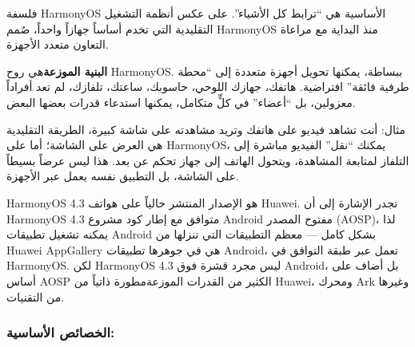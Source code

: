 


فلسفة HarmonyOS الأساسية هي “ترابط كل الأشياء”. على عكس أنظمة التشغيل التقليدية التي تخدم أساساً جهازاً واحداً، صُمم HarmonyOS منذ البداية مع مراعاة التعاون متعدد الأجهزة.

\textbf{البنية الموزعة}هي روح HarmonyOS. ببساطة، يمكنها تحويل أجهزة متعددة إلى “محطة طرفية فائقة” افتراضية. هاتفك، جهازك اللوحي، حاسوبك، ساعتك، تلفازك، لم تعد أفراداً معزولين، بل “أعضاء” في كلٍّ متكامل، يمكنها استدعاء قدرات بعضها البعض.

مثال: أنت تشاهد فيديو على هاتفك وتريد مشاهدته على شاشة كبيرة، الطريقة التقليدية هي العرض على الشاشة؛ أما على HarmonyOS، يمكنك “نقل” الفيديو مباشرة إلى التلفاز لمتابعة المشاهدة، ويتحول الهاتف إلى جهاز تحكم عن بعد. هذا ليس عرضاً بسيطاً على الشاشة، بل التطبيق نفسه يعمل عبر الأجهزة.


HarmonyOS 4.3 هو الإصدار المنتشر حالياً على هواتف Huawei. تجدر الإشارة إلى أن HarmonyOS 4.3 متوافق مع إطار كود مشروع Android مفتوح المصدر (AOSP)، لذا يمكنه تشغيل تطبيقات Android بشكل كامل — معظم التطبيقات التي تنزلها من Huawei AppGallery هي في جوهرها تطبيقات Android، تعمل عبر طبقة التوافق في HarmonyOS. لكن HarmonyOS 4.3 ليس مجرد قشرة فوق Android، بل أضاف على أساس AOSP الكثير من القدرات الموزعةمطورة ذاتياً من Huawei، ومحرك Ark وغيرها من التقنيات.

\subsubsection*{الخصائص الأساسية:}

